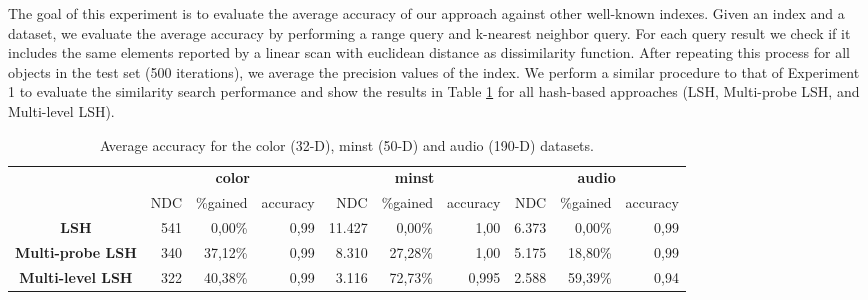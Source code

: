The goal of this experiment is to evaluate the average accuracy of our approach  against other well-known indexes. Given an index and a dataset, we evaluate the average accuracy by performing a range query and k-nearest neighbor query. For each query result we check if it includes the same elements reported by a linear scan with euclidean distance as dissimilarity function. After repeating this process for all objects in the test set (500 iterations), we average the precision values of the index.  We perform a similar procedure to that of Experiment 1 to evaluate the similarity search performance and show the results in Table \ref{tab:accuracy} for all hash-based approaches (LSH, Multi-probe LSH, and Multi-level LSH). 
\begin{table}[htbp]
\begin{footnotesize}
\centering
  \begin{tabular}{c|r|r|r|r|r|r|r|r|r|}
  \cline{2-10}
    & \multicolumn{3}{|c|}{{\bf color}} & \multicolumn{ 3}{|c|}{{\bf minst}} & \multicolumn{ 3}{|c|}{{\bf audio}} \\
    \cline{2-10}
   & NDC   & \%gained & accuracy & NDC   & \%gained & accuracy & NDC   & \%gained & accuracy \\
    \hline

  \multicolumn{1}{|c|}{\bf LSH} & 541   & 0,00\% & 0,99 & 11.427 & 0,00\% & 1,00                    & 6.373 & 0,00\% & 0,99 \\
  \multicolumn{1}{|c|}{\bf Multi-probe LSH} & 340   & 37,12\% & 0,99 & 8.310 & 27,28\% & 1,00       & 5.175 & 18,80\% & 0,99 \\
  \multicolumn{1}{|c|}{\bf Multi-level LSH} & 322   & 40,38\% & 0,99 & 3.116 & 72,73\% & 0,995      & 2.588 & 59,39\% & 0,94 \\
      \hline
  \end{tabular}
\end{footnotesize}
\caption{Average accuracy for the color (32-D), minst (50-D) and audio (190-D) datasets.}
\label{tab:accuracy}
\end{table}

